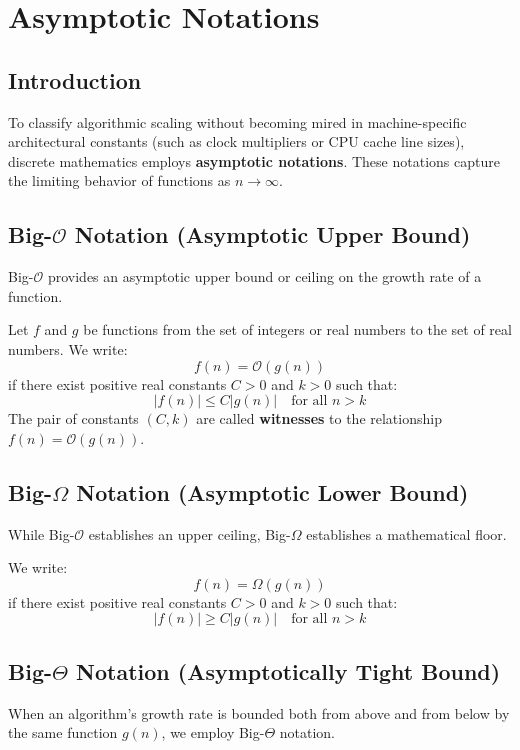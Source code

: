 \chapter{Asymptotic Notations}
\label{chap:asymptotic}

\section{Introduction}
To classify algorithmic scaling without becoming mired in machine-specific architectural constants (such as clock multipliers or CPU cache line sizes), discrete mathematics employs \textbf{asymptotic notations}. These notations capture the limiting behavior of functions as $n \to \infty$.

\section{Big-$\mathcal{O}$ Notation (Asymptotic Upper Bound)}
Big-$\mathcal{O}$ provides an asymptotic upper bound or ceiling on the growth rate of a function.

\begin{definition}
Let $f$ and $g$ be functions from the set of integers or real numbers to the set of real numbers. We write:
$$f(n) = \mathcal{O}(g(n))$$
if there exist positive real constants $C > 0$ and $k > 0$ such that:
$$|f(n)| \le C |g(n)| \quad \text{for all } n > k$$
The pair of constants $(C, k)$ are called \textbf{witnesses} to the relationship $f(n) = \mathcal{O}(g(n))$.
\end{definition}

\section{Big-$\Omega$ Notation (Asymptotic Lower Bound)}
While Big-$\mathcal{O}$ establishes an upper ceiling, Big-$\Omega$ establishes a mathematical floor.

\begin{definition}
We write:
$$f(n) = \Omega(g(n))$$
if there exist positive real constants $C > 0$ and $k > 0$ such that:
$$|f(n)| \ge C |g(n)| \quad \text{for all } n > k$$
\end{definition}

\section{Big-$\Theta$ Notation (Asymptotically Tight Bound)}
When an algorithm's growth rate is bounded both from above and from below by the same function $g(n)$, we employ Big-$\Theta$ notation.

